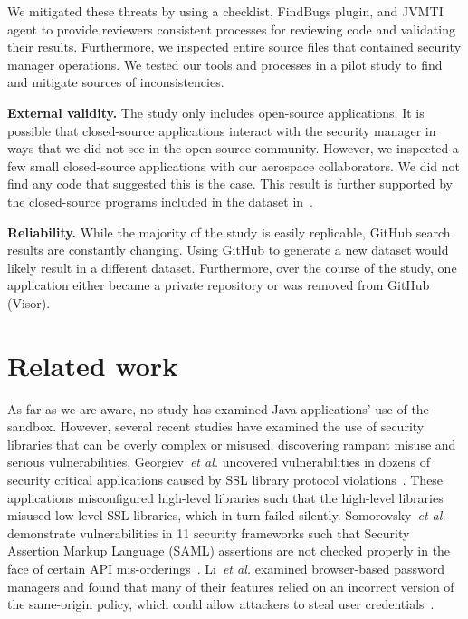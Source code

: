 \documentclass{sig-alternate}
\newcommand{\minisec}[1]{\noindent\textbf{#1}}
\begin{document}
We mitigated these threats by using a checklist, FindBugs plugin, and JVMTI agent to
provide reviewers consistent processes for reviewing code
and validating their results. Furthermore,
we inspected entire source files that contained
security manager operations. We tested our tools and processes in a pilot study
to find and mitigate sources of inconsistencies.

\minisec{External validity.}
The study only includes open-source applications. It is possible
that closed-source applications interact with the security manager
in ways that we did not see in the open-source community. However,
we inspected a few small closed-source applications with our aerospace collaborators.
We did not find any code that suggested this is the case.  This result is
further supported by the closed-source programs included in the dataset
in~. 

\minisec{Reliability.}
While the majority of the study is easily replicable, GitHub search results are constantly
changing. Using GitHub to generate a new dataset
would likely result in a different dataset. Furthermore, over the course of the
study, one application either became a private repository
or was removed from GitHub (Visor).

\section{Related work}
\label{sec:related}

As far
as we are aware, no study has examined Java applications' use of the
sandbox. However, several recent studies have examined the use of security
libraries that can be overly complex or 
misused, discovering rampant misuse and
serious vulnerabilities.
Georgiev~\emph{et al.} uncovered vulnerabilities in dozens of security critical
applications caused by SSL library protocol violations~\cite{georgiev12most-dangerous}.
These applications misconfigured high-level libraries such that the
high-level libraries misused low-level SSL libraries, which in turn
failed silently. Somorovsky~\emph{et al.} demonstrate vulnerabilities in
11 security frameworks such that Security Assertion Markup Language
(SAML) assertions are not checked properly in the face of certain API
mis-orderings~\cite{somorovsky12breaking}. Li~\emph{et al.} examined
browser-based  
password managers and found that many of their features relied on
an incorrect version of the same-origin policy, which could allow
attackers to steal user credentials~\cite{li2014emperor}.
\end{document}
